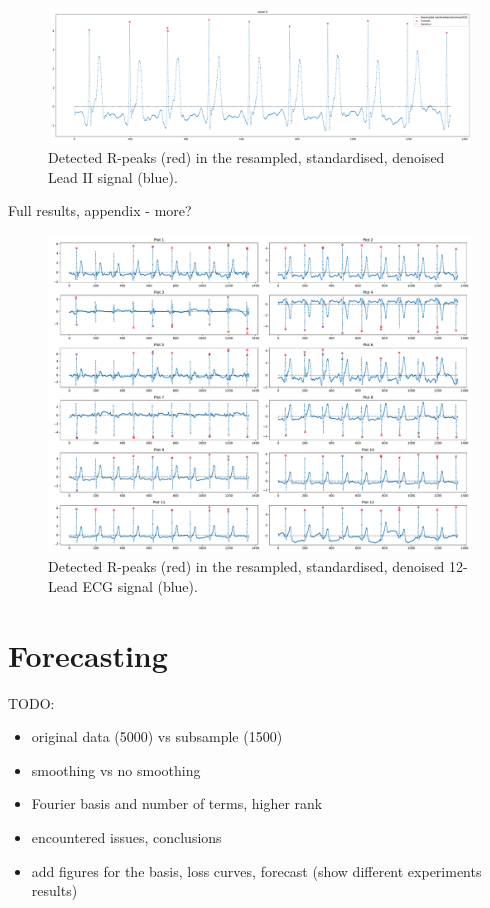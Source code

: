 \documentclass{mldsmsc}
\begin{document}
\begin{figure}[H]
\centering
\includegraphics[width=1\linewidth]{images/r_peaks/resampled_standardised_denoised_ecg_rpeaks_m.pdf}
\caption{Detected R-peaks (red) in the resampled, standardised, denoised Lead II signal (blue).}
\label{fig:rpeaks-ecg}
\end{figure}

Full results, appendix - more?

\begin{figure}[H]
\centering
\includegraphics[width=1\linewidth]{images/r_peaks/rpeaks_full_m.pdf}
\caption{Detected R-peaks (red) in the resampled, standardised, denoised 12-Lead ECG signal (blue).}
\label{fig:rpeaks-ecg}
\end{figure}

\section{Forecasting}

TODO:

\begin{itemize}
    \item original data (5000) vs subsample (1500)
    \item smoothing vs no smoothing
    \item Fourier basis and number of terms, higher rank
    \item encountered issues, conclusions
    \item add figures for the basis, loss curves, forecast (show different experiments results)
\end{itemize}
\end{document}
